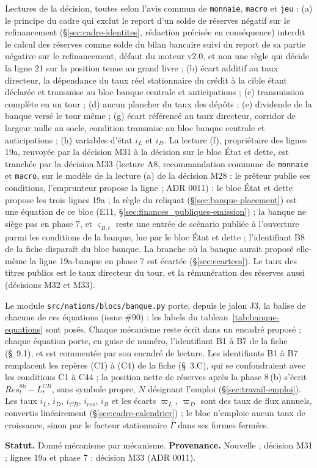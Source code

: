 \documentclass[11pt,a4paper]{article}
\begin{document}
\begin{proposee}
Lectures de la décision, toutes selon l'avis commun de \texttt{monnaie}, \texttt{macro} et \texttt{jeu} : (a) le principe du cadre qui exclut le report d'un solde de réserves négatif sur le refinancement (\S\ref{sec:cadre-identites}, rédaction précisée en conséquence) interdit le calcul des réserves comme solde du bilan bancaire suivi du report de sa partie négative sur le refinancement, défaut du moteur v2.0, et non une règle qui décide la ligne 21 sur la position tenue au grand livre ; (b) écart additif au taux directeur, la dépendance du taux réel stationnaire du crédit à la cible étant déclarée et transmise au bloc banque centrale et anticipations ; (c) transmission complète en un tour ; (d) aucun plancher du taux des dépôts ; (e) dividende de la banque versé le tour même ; (g) écart référencé au taux directeur, corridor de largeur nulle au socle, condition transmise au bloc banque centrale et anticipations ; (h) variables d'état $i_L$ et $i_D$. La lecture (f), propriétaire des lignes 19a, renvoyée par la décision M31 à la décision sur le bloc État et dette, est tranchée par la décision M33 (lecture A8, recommandation commune de \texttt{monnaie} et \texttt{macro}, sur le modèle de la lecture (a) de la décision M28 : le prêteur publie ses conditions, l'emprunteur propose la ligne ; ADR 0011) : le bloc État et dette propose les trois lignes 19a ; la règle du reliquat (\S\ref{sec:banque-placement}) est une équation de ce bloc (E11, \S\ref{sec:finances_publiques-emission}) ; la banque ne siège pas en phase 7, et $\varsigma_{B,t}$ reste une entrée de scénario publiée à l'ouverture parmi les conditions de la banque, lue par le bloc État et dette ; l'identifiant B8 de la fiche disparaît du bloc banque. La branche où la banque aurait proposé elle-même la ligne 19a-banque en phase 7 est écartée (\S\ref{sec:ecartees}). Le taux des titres publics est le taux directeur du tour, et la rémunération des réserves aussi (décisions M32 et M33).

Le module \nolinkurl{src/nations/blocs/banque.py} porte, depuis le jalon J3, la balise de chacune de ces équations (issue \#90) : les labels du tableau~\ref{tab:banque-equations} sont posés. Chaque mécanisme reste écrit dans un encadré proposé ; chaque équation porte, en guise de numéro, l'identifiant B1 à B7 de la fiche (\S~9.1), et est commentée par son encadré de lecture. Les identifiants B1 à B7 remplacent les repères (C1) à (C4) de la fiche (\S~3.C), qui se confondraient avec les conditions C1 à C44 ; la position nette de réserves après la phase 8\,(b) s'écrit $\mathit{Res}^{8\mathrm{b}}_t - L^{\mathit{CB}}_t$, sans symbole propre, $N$ désignant l'emploi (\S\ref{sec:travail-emploi}). Les taux $i_L$, $i_D$, $i_{\mathit{CB}}$, $i_{\mathit{res}}$, $i_B$ et les écarts $\varpi_L$, $\varpi_D$ sont des taux de flux annuels, convertis linéairement (\S\ref{sec:cadre-calendrier}) ; le bloc n'emploie aucun taux de croissance, sinon par le facteur stationnaire $\bar\Gamma$ dans ses formes fermées.

\textbf{Statut.} Donné mécanisme par mécanisme. \textbf{Provenance.} Nouvelle ; décision M31 ; lignes 19a et phase 7 : décision M33 (ADR 0011).
\end{proposee}
\end{document}
